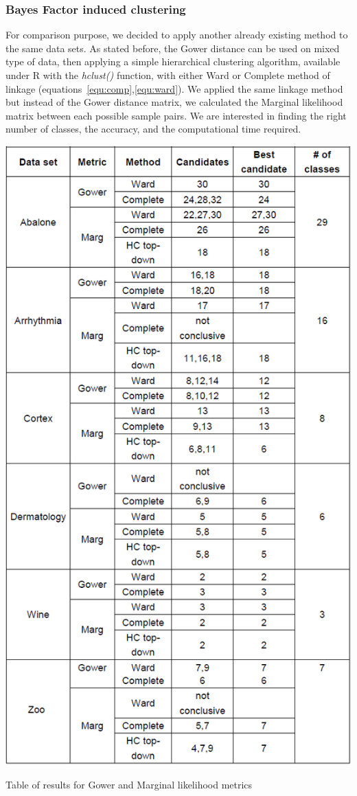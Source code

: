 \documentclass[twocolumn]{article}
\begin{document}
\subsubsection{Bayes Factor induced clustering}

For comparison purpose, we decided to apply another already existing method to the same data sets. As stated before, the Gower distance can be used on mixed type of data, then applying a simple hierarchical clustering algorithm, available under R with the \emph{hclust()} function, with either Ward or Complete method of linkage (equations~\ref{equ:comp},\ref{equ:ward}).
We applied the same linkage method but instead of the Gower distance matrix, we calculated the Marginal likelihood matrix between each possible sample pairs.
We are interested in finding the right number of classes, the accuracy, and the computational time required.
\begin{table}[!]
    \centering
    \includegraphics[scale=0.35]{img/ResultsTable.png}
    \caption{Table of results for Gower and Marginal likelihood metrics}
    \label{tab:ResTab}
\end{table}
\end{document}
